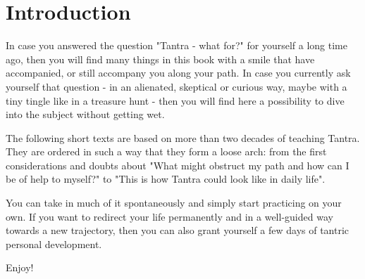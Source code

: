 \section{Introduction}

In case you answered the question "Tantra - what for?" for yourself a long time ago, then you will find many things in this book with a smile that have accompanied, or still accompany you along your path.
In case you currently ask yourself that question - in an alienated, skeptical or curious way, maybe with a tiny tingle like in a treasure hunt - then you will find here a possibility to dive into the subject without getting wet.

The following short texts are based on more than two decades of teaching Tantra. They are ordered in such a way that they form a loose arch: from the first considerations and doubts about "What might obstruct my path and how can I be of help to myself?" to "This is how Tantra could look like in daily life".

You can take in much of it spontaneously and simply start practicing on your own. If you want to redirect your life permanently and in a well-guided way towards a new trajectory, then you can also grant yourself a few days of tantric personal development.

Enjoy!
